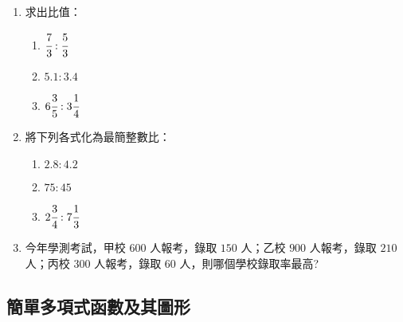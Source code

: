 \documentclass[bwprint,a4paper]{extarticle}
\begin{document}
\vspace{30ex}
\begin{observing}
	\begin{enumerate}
		\item 求出比值：
		\begin{enumerate}[label=(\arabic*)]
			\item $\cfrac73:\cfrac53$
			\item $5.1:3.4$
			\item $6\cfrac35:3\cfrac14$
		\end{enumerate}
		\item 將下列各式化為最簡整數比：
		\begin{enumerate}[label=(\arabic*)]
			\item $2.8:4.2$
			\item $75:45$
			\item $2\cfrac34:7\cfrac13$
		\end{enumerate}
		\item 今年學測考試，甲校 $600$ 人報考，錄取 $150$ 人；乙校 $900$ 人報考，錄取 $210$ 人；丙校 $300$ 人報考，錄取 $60$ 人，則哪個學校錄取率最高?
	\end{enumerate}
\end{observing}
\newpage

\subsection{簡單多項式函數及其圖形}
\end{document}
